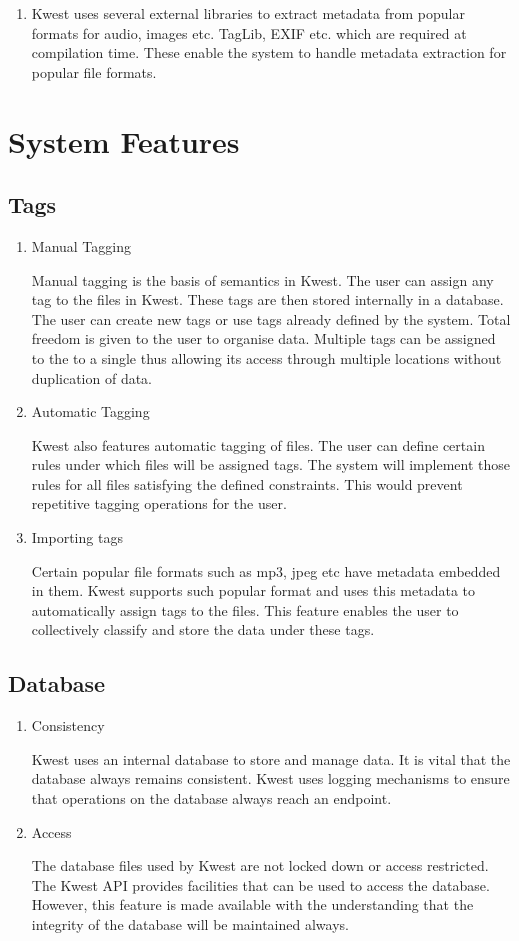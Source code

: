 \begin{enumerate}
 \item Kwest uses several external libraries to extract metadata from popular formats for
audio, images etc. TagLib, EXIF etc. which are required at compilation time. These
enable the system to handle metadata extraction for popular file formats.


 \end{enumerate} 


\section{System Features}
\subsection {Tags}
\begin{enumerate}
\item Manual Tagging 

Manual tagging is the basis of semantics in Kwest. The user can assign any tag to the files in Kwest. These tags are then stored internally in a database. The user can create new tags or use tags already defined by the system. Total freedom is given to the user to organise data. Multiple tags can be assigned to the to a single thus allowing its access through multiple locations without duplication of data.
\item Automatic Tagging 

Kwest also features automatic tagging of files. The user can define certain rules under which files will be assigned tags. The system will implement those rules for all files satisfying the defined constraints. This would prevent repetitive tagging operations for the user. 
\item Importing tags 

Certain popular file formats such as mp3, jpeg etc have metadata embedded in them. Kwest supports such popular format and uses this metadata to automatically assign tags to the files. This feature enables the user to collectively classify and store the data under these tags.
\end{enumerate}

\subsection{Database}
\begin{enumerate}
\item Consistency 

Kwest uses an internal database to store and manage data. It is vital that the database always remains consistent. Kwest uses logging mechanisms to ensure that operations on the database always reach an endpoint. 
\item Access 

The database files used by Kwest are not locked down or access restricted. The Kwest API provides facilities that can be used to access the database. However, this feature is made available with the understanding that the integrity of the database will be maintained always.
\end{enumerate}

